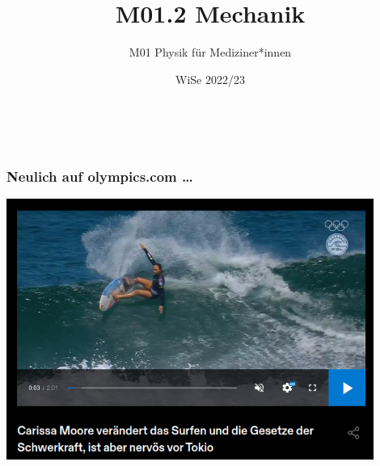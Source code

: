 \documentclass{beamer}
\title[M01.2 Mechanik]{M01.2 Mechanik}
\author[melanie.stefan@medicalschool-berlin.de]{M01 Physik für Mediziner*innen}
\institute[]{Prof. Melanie Stefan - melanie.stefan@medcialschool-berlin.de}
\date{WiSe 2022/23}
\begin{document}
 
 {  
\begin{frame}

 \maketitle 

$\,$\\[6cm] 


\end{frame} 
}
 

\begin{frame}
\frametitle{Neulich auf  olympics.com \dots}

\begin{center}
\includegraphics[width=0.9\textwidth]{surfen_schwerkraft.png}
\end{center}

 
\end{frame}
\end{document}
